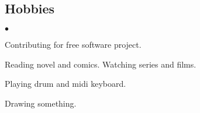 \documentclass[margin,line]{res}
\newenvironment{list2}{
  \begin{list}{$\bullet$}{%
      \setlength{\itemsep}{0in}
      \setlength{\parsep}{0in} \setlength{\parskip}{0in}
      \setlength{\topsep}{0in} \setlength{\partopsep}{0in}
      \setlength{\leftmargin}{0.1in}}}{\end{list}}
\begin{document}
\begin{resume}
\vspace{-.3cm}
\section{\sc Hobbies}
\begin{list2}
\item Contributing for free software project.
\item Reading novel and comics. Watching series and films.
\item Playing drum and midi keyboard.
\item Drawing something.
\end{list2}

\end{resume}
\end{document}
